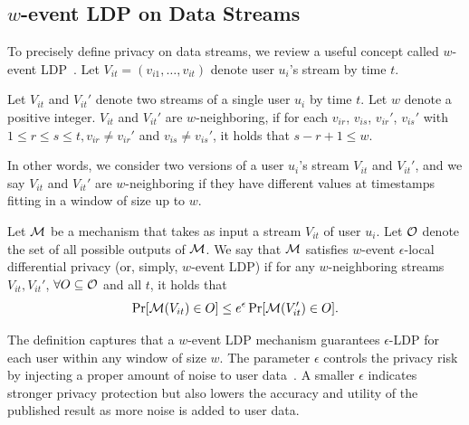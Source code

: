 \subsection{\texorpdfstring{$w$-event LDP on Data Streams}{w-event LDP on Data Streams}}
To precisely define privacy on data streams, we review a useful concept called
$w$-event LDP~\cite{Ren2022}.
Let $V_{it}=(v_{i1},\ldots,v_{it})$ denote user $u_i$'s stream by time $t$.

\begin{definition}[$w$-neighboring]
  Let $V_{it}$ and $V_{it}'$ denote two streams of a single user $u_i$ by time
  $t$.
  Let $w$ denote a positive integer.
  $V_{it}$ and $V_{it}'$ are $w$-neighboring, if for each $v_{ir}$, $v_{is}$,
  $v_{ir}'$, $v_{is}'$ with $1\le r \le s \le t, v_{ir}\neq v_{ir}'$ and $v_{is}
  \neq v_{is}'$, it holds that $s - r + 1 \le w$.
\end{definition}

In other words, we consider two versions of a user $u_i$'s stream $V_{it}$ and
$V_{it}'$, and we say $V_{it}$ and $V_{it}'$ are $w$-neighboring if they have
different values at timestamps fitting in a window of size up to $w$.

\begin{definition}
  Let $\mathcal{M}$ be a mechanism that takes as input a stream $V_{it}$ of user $u_i$.
  Let $\mathcal{O}$ denote the set of all possible outputs of $\mathcal{M}$.
  We say that $\mathcal{M}$ satisfies $w$-event $\epsilon$-local differential privacy
  (or, simply, $w$-event LDP) if for any $w$-neighboring streams $V_{it},
  V_{it}'$, $\forall O\subseteq\mathcal{O}$ and all $t$, it holds that
  \[
    \Pr[\mathcal{M}(V_{it})\in O] \leq e^\epsilon \Pr[\mathcal{M}(V_{it}') \in O].
  \]
\end{definition}

The definition captures that a $w$-event LDP mechanism guarantees $\epsilon$-LDP
for each user within any window of size $w$.
The parameter $\epsilon$ controls the privacy risk by injecting a proper amount
of noise to user data~\cite{Dwork2013}.
A smaller $\epsilon$ indicates stronger privacy protection but also lowers the
accuracy and utility of the published result as more noise is added to user
data.
